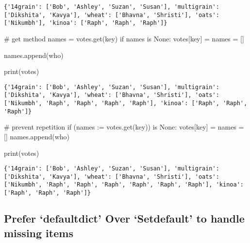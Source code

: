 \documentclass[
]{report}
\newenvironment{Shaded}{\begin{snugshade}}{\end{snugshade}}
\newcommand{\BuiltInTok}[1]{\textcolor[rgb]{0.00,0.23,0.31}{#1}}
\newcommand{\CommentTok}[1]{\textcolor[rgb]{0.37,0.37,0.37}{#1}}
\newcommand{\ControlFlowTok}[1]{\textcolor[rgb]{0.00,0.23,0.31}{#1}}
\newcommand{\KeywordTok}[1]{\textcolor[rgb]{0.00,0.23,0.31}{#1}}
\newcommand{\NormalTok}[1]{\textcolor[rgb]{0.00,0.23,0.31}{#1}}
\newcommand{\OperatorTok}[1]{\textcolor[rgb]{0.37,0.37,0.37}{#1}}
\newcommand{\VariableTok}[1]{\textcolor[rgb]{0.07,0.07,0.07}{#1}}
\begin{document}
\begin{verbatim}
{'14grain': ['Bob', 'Ashley', 'Suzan', 'Susan'], 'multigrain': ['Dikshita', 'Kavya'], 'wheat': ['Bhavna', 'Shristi'], 'oats': ['Nikumbh'], 'kinoa': ['Raph', 'Raph', 'Raph']}
\end{verbatim}

\begin{Shaded}
\begin{Highlighting}[]
\CommentTok{\# get method}
\NormalTok{names }\OperatorTok{=}\NormalTok{ votes.get(key)}
\ControlFlowTok{if}\NormalTok{ names }\KeywordTok{is} \VariableTok{None}\NormalTok{:}
\NormalTok{    votes[key] }\OperatorTok{=}\NormalTok{ names }\OperatorTok{=}\NormalTok{ []}
    
\NormalTok{names.append(who)}

\BuiltInTok{print}\NormalTok{(votes)}
\end{Highlighting}
\end{Shaded}

\begin{verbatim}
{'14grain': ['Bob', 'Ashley', 'Suzan', 'Susan'], 'multigrain': ['Dikshita', 'Kavya'], 'wheat': ['Bhavna', 'Shristi'], 'oats': ['Nikumbh', 'Raph', 'Raph', 'Raph', 'Raph'], 'kinoa': ['Raph', 'Raph', 'Raph']}
\end{verbatim}

\begin{Shaded}
\begin{Highlighting}[]
\CommentTok{\# prevent repetition}
\ControlFlowTok{if}\NormalTok{ (names }\OperatorTok{:=}\NormalTok{ votes.get(key)) }\KeywordTok{is} \VariableTok{None}\NormalTok{:}
\NormalTok{    votes[key] }\OperatorTok{=}\NormalTok{ names }\OperatorTok{=}\NormalTok{ []}
\NormalTok{names.append(who)}

\BuiltInTok{print}\NormalTok{(votes)}
\end{Highlighting}
\end{Shaded}

\begin{verbatim}
{'14grain': ['Bob', 'Ashley', 'Suzan', 'Susan'], 'multigrain': ['Dikshita', 'Kavya'], 'wheat': ['Bhavna', 'Shristi'], 'oats': ['Nikumbh', 'Raph', 'Raph', 'Raph', 'Raph', 'Raph', 'Raph'], 'kinoa': ['Raph', 'Raph', 'Raph']}
\end{verbatim}

\hypertarget{prefer-defaultdict-over-setdefault-to-handle-missing-items}{%
\subsection{Prefer `defaultdict' Over `Setdefault' to handle missing
items}\label{prefer-defaultdict-over-setdefault-to-handle-missing-items}}
\end{document}
